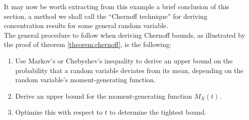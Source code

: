 	It may now be worth extracting from this example a brief conclusion of this section, a 
	method we shall call the ``Chernoff technique'' for deriving concentration results for 
	some general random variable.\\
	The general procedure to follow when deriving Chernoff bounds, as illustrated by the proof 
	of theorem \ref{theorem:chernoff}, is the following:
	\begin{enumerate}[(1)]
		\item Use Markov's or Chebyshev's inequality to derive an upper bound on the 
		probability that a random variable deviates from its mean, depending on the random 
		variable's moment-generating function.
		\item Derive an upper bound for the moment-generating function $M_X(t)$.
		\item Optimize this with respect to $t$ to determine the tightest bound.
	\end{enumerate}

